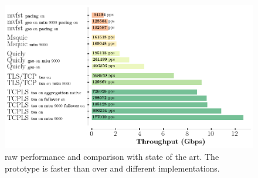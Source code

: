 \begin{figure}[!t]
  \begin{center}
    \includegraphics[width=\columnwidth]{figures/perf_analysis.png}
  \end{center}
\vspace{-0.5cm}
  \caption{\tcpls raw performance and comparison with state of the art.  The \tcpls prototype is faster than \tls over \tcp and different \quic implementations.}
  \label{fig:perf}
\end{figure}



